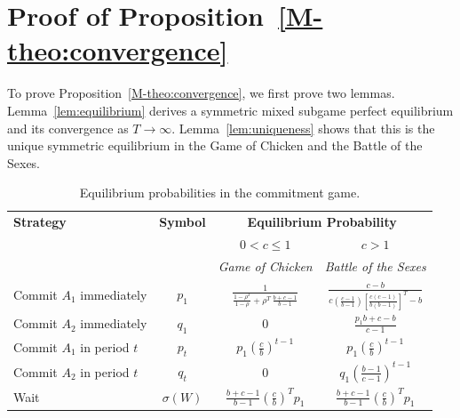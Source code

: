 \documentclass[letterpaper]{article}
\newcommand{\bparam}{b}
\newcommand{\cparam}{c}
\theoremstyle{definition}
\begin{document}
\section{Proof of Proposition~\ref{M-theo:convergence}}\label{sec:prooftheo2}
To prove Proposition~\ref{M-theo:convergence}, we first prove two lemmas. Lemma~\ref{lem:equilibrium} derives a symmetric mixed subgame perfect equilibrium and its convergence as $T\to\infty$. Lemma~\ref{lem:uniqueness} shows that this is the unique symmetric equilibrium in the Game of Chicken and the Battle of the Sexes.
\begin{table}[t]
    \centering
    \renewcommand{\arraystretch}{1.8}
    \begin{tabular}{lccc}
        \toprule
        \textbf{Strategy} & \textbf{Symbol} & \multicolumn{2}{c}{\textbf{Equilibrium Probability}} \\
         & & $0 < \cparam \leq 1$ & $\cparam > 1$ \\
         & & \textit{Game of Chicken} & \textit{Battle of the Sexes} \\
        \midrule

        Commit $A_1$ immediately & $p_1$ &
        $\tfrac{1}{\tfrac{1 - \rho^{T}}{1 - \rho} + \rho^{T}\,\tfrac{\bparam + \cparam - 1}{\bparam - 1}}$ &
        $\tfrac{\cparam - \bparam}{\cparam \left(\tfrac{\cparam-1}{\bparam-1}\right) \left[ \tfrac{\cparam(\cparam - 1)}{\bparam(\bparam - 1)} \right]^T - \bparam}$ \\

        Commit $A_2$ immediately & $q_1$ &
        $0$ &
        $\tfrac{p_1 \bparam + \cparam - \bparam}{\cparam - 1}$ \\

        Commit $A_1$ in period $t$ & $p_t$ &
        $p_1 \left( \tfrac{\cparam}{\bparam} \right)^{t - 1}$ &
        $p_1 \left( \tfrac{\cparam}{\bparam} \right)^{t - 1}$ \\

        Commit $A_2$ in period $t$ & $q_t$ &
        $0$ &
        $q_1 \left( \tfrac{\bparam - 1}{\cparam - 1} \right)^{t - 1}$ \\

        Wait & $\sigma(W)$ &
        $\tfrac{\bparam + \cparam - 1}{\bparam-1} \left( \tfrac{\cparam}{\bparam} \right)^T p_1$ &
        $\tfrac{\bparam + \cparam - 1}{\bparam-1} \left( \tfrac{\cparam}{\bparam} \right)^T p_1$ \\
        \bottomrule
    \end{tabular}
    \caption{Equilibrium probabilities in the commitment game.}
    \label{tab:lemma4-probabilities}
\end{table}
\end{document}
